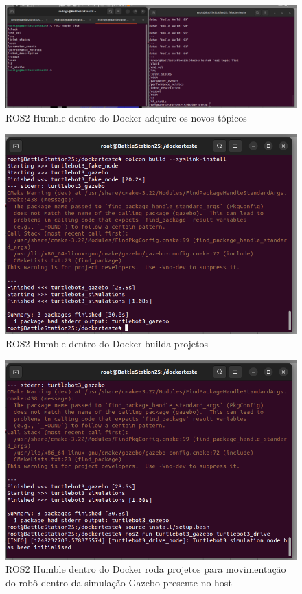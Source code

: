\begin{figure}[htb]
    \centering
    \includegraphics[width=1\linewidth]{Figures/DockerAdquireTopicos.png}
    \caption{ROS2 Humble dentro do Docker adquire os novos tópicos}
    \label{fig:enter-label}
\end{figure}
\begin{figure}[htb]
    \centering
    \includegraphics[width=1\linewidth]{Figures/DockerBuildaProjetos.png}
    \caption{ROS2 Humble dentro do Docker builda projetos}
    \label{fig:enter-label}
\end{figure}
\begin{figure}[htb]
    \centering
    \includegraphics[width=1\linewidth]{Figures/DockerRodaProjetoDrive.png}
    \caption{ROS2 Humble dentro do Docker roda projetos para movimentação do robô dentro da simulação Gazebo presente no host}
    \label{fig:enter-label}
\end{figure}
